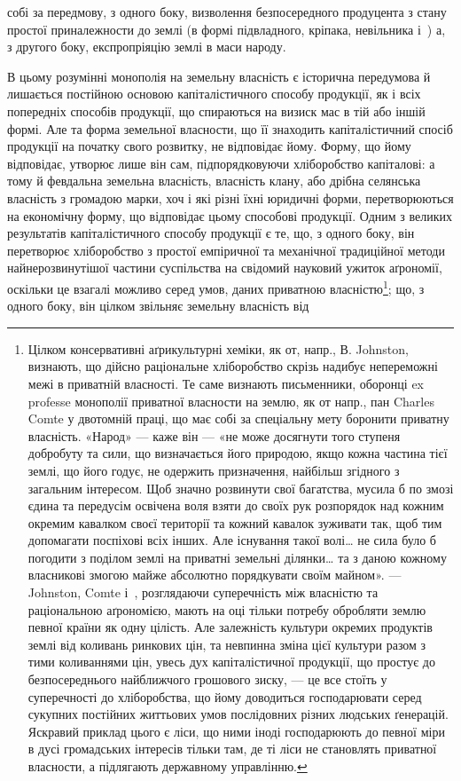 \parcont{}  %
собі за передмову, з одного боку, визволення безпосередного продуцента з стану
простої приналежности до землі (в формі підвладного, кріпака, невільника і~)
а, з другого боку, експропріяцію землі в маси народу.

В цьому розумінні монополія на земельну власність є історична передумова й
лишається постійною основою капіталістичного способу продукції, як і всіх попередніх
способів продукції, що спираються на визиск мас в тій або іншій
формі. Але та форма земельної власности, що її знаходить капіталістичний
спосіб продукції на початку свого розвитку, не відповідає йому. Форму, що йому
відповідає, утворює лише він сам, підпорядковуючи хліборобство капіталові:
а тому й февдальна земельна власність, власність клану, або дрібна селянська
власність з громадою марки, хоч і які різні їхні юридичні форми,
перетворюються на економічну форму, що відповідає цьому способові продукції.
Одним з великих результатів капіталістичного способу продукції є те, що, з одного
боку, він перетворює хліборобство з простої емпіричної та механічної
традиційної методи найнерозвинутішої частини суспільства на свідомий науковий
ужиток аґрономії, оскільки це взагалі можливо серед умов, даних приватною
власністю\footnote{
Цілком консервативні аґрикультурні хеміки, як от, напр., В. Johnston, визнають, що дійсно
раціональне хліборобство скрізь надибує непереможні межі в приватній власності. Те саме визнають
письменники, оборонці ex professe монополії приватної власности на землю, як от напр., пан Charles
Comte у двотомній праці, що має собі за спеціальну мету боронити приватну власність. «Народ» — каже
він — «не може досягнути того ступеня добробуту та сили, що визначається його природою, якщо
кожна частина тієї землі, що його годує, не одержить призначення, найбільш згідного з загальним
інтересом. Щоб значно розвинути свої багатства, мусила б по змозі єдина та передусім освічена воля
взяти до своїх рук розпорядок над кожним окремим кавалком своєї території та кожний кавалок зуживати
так, щоб тим допомагати поспіхові всіх інших. Але існування такої волі\dots{} не сила було б погодити
з поділом землі на приватні земельні ділянки\dots{} та з даною кожному власникові змогою майже абсолютно
порядкувати своїм майном». — Johnston, Comte і~, розглядаючи суперечність між власністю та
раціональною аґрономією, мають на оці тільки потребу обробляти землю певної країни як одну цілість.
Але залежність культури окремих продуктів землі від коливань ринкових цін, та невпинна зміна цієї
культури разом з тими коливаннями цін, увесь дух капіталістичної продукції, що простує до
безпосереднього
найближчого грошового зиску, — це все стоїть у суперечності до хліборобства, що йому
доводиться господарювати серед сукупних постійних життьових умов послідовних різних людських
ґенерацій.
Яскравий приклад цього є ліси, що ними іноді господарюють до певної міри в дусі громадських
інтересів
тільки там, де ті ліси не становлять приватної власности, а підлягають державному управлінню.
}; що, з одного боку, він цілком звільняє земельну власність від
